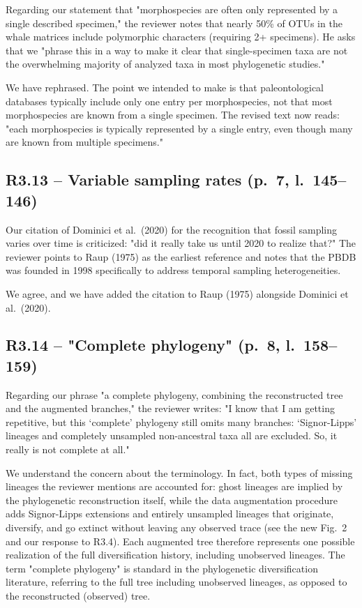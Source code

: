 \documentclass[11pt]{article}
\newcommand{\response}[1]{\noindent\textcolor{resp}{#1}\medskip}
\begin{document}
Regarding our statement that "morphospecies are often only represented by a single described specimen," the reviewer notes that nearly 50\% of OTUs in the whale matrices include polymorphic characters (requiring 2+ specimens). He asks that we "phrase this in a way to make it clear that single-specimen taxa are not the overwhelming majority of analyzed taxa in most phylogenetic studies."

\response{We have rephrased. The point we intended to make is that paleontological databases typically include only one entry per morphospecies, not that most morphospecies are known from a single specimen. The revised text now reads: "each morphospecies is typically represented by a single entry, even though many are known from multiple specimens."}

\subsection*{R3.13 -- Variable sampling rates (p.\ 7, l.\ 145--146)}

Our citation of Dominici et al.\ (2020) for the recognition that fossil sampling varies over time is criticized: "did it really take us until 2020 to realize that?" The reviewer points to Raup (1975) as the earliest reference and notes that the PBDB was founded in 1998 specifically to address temporal sampling heterogeneities.

\response{We agree, and we have added the citation to Raup (1975) alongside Dominici et al.\ (2020).}

\subsection*{R3.14 -- "Complete phylogeny" (p.\ 8, l.\ 158--159)}

Regarding our phrase "a complete phylogeny, combining the reconstructed tree and the augmented branches," the reviewer writes: "I know that I am getting repetitive, but this `complete' phylogeny still omits many branches: `Signor-Lipps' lineages and completely unsampled non-ancestral taxa all are excluded. So, it really is not complete at all."

\response{We understand the concern about the terminology. In fact, both types of missing lineages the reviewer mentions are accounted for: ghost lineages are implied by the phylogenetic reconstruction itself, while the data augmentation procedure adds Signor-Lipps extensions and entirely unsampled lineages that originate, diversify, and go extinct without leaving any observed trace (see the new Fig.~2 and our response to R3.4). Each augmented tree therefore represents one possible realization of the full diversification history, including unobserved lineages. The term "complete phylogeny" is standard in the phylogenetic diversification literature, referring to the full tree including unobserved lineages, as opposed to the reconstructed (observed) tree.}
\end{document}
